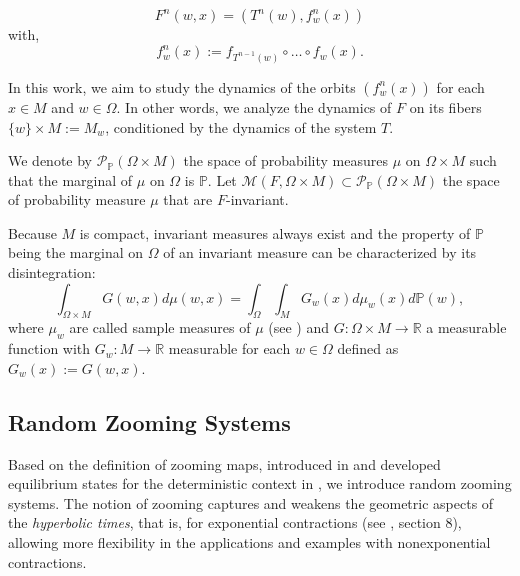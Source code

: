 \documentclass[12pt,a4paper]{amsart}
\theoremstyle{plain}
\begin{document}
	$$
	F^{n}(w, x) = (T^{n}(w), f^{n}_{w}(x))
	$$
	with, 
	\[
	f^{n}_{w}(x):= f_{T^{n-1}(w)} \circ \dots \circ f_{w}(x).
	\]
	
	
	
	In this work, we aim to study the dynamics of the orbits $(f_w^n(x))$ for each $x\in M$ and $w\in \Omega$. In other words, we analyze the dynamics of $F$ on its fibers $\{w\}\times M:=M_w$, conditioned by the dynamics of the system $T$.
	
	We denote by $\mathcal{P}_{\mathbb{P}}(\Omega \times M)$ the space of probability measures $\mu$ on $\Omega \times M$ such that the marginal of $\mu$ on $\Omega$ is $\mathbb{P}$. Let $\mathcal{M}(F, \Omega \times M) \subset \mathcal{P}_{\mathbb{P}}(\Omega \times M)$ the space of probability measure $\mu$ that are $F$-invariant. 
	
	Because $M$ is compact, invariant measures always exist and the property of $\mathbb{P}$ being the
	marginal on $\Omega$ of an invariant measure can be characterized by its disintegration:
	\[
	\int_{\Omega\times M} G(w,x) d\mu(w,x) =\int_{\Omega} \int_{M} G_{w}(x) d\mu_{w}(x)d\mathbb{P}(w),	
	\]
	where $\mu_{w}$ are called sample measures of $\mu$ (see \cite{L}) and $G:\Omega\times M \rightarrow \mathbb{R}$ a measurable function with $G_w:M\rightarrow \mathbb{R}$ measurable for each $w\in \Omega$ defined as $G_{w}(x):= G(w,x)$.
	
	\subsection{Random Zooming Systems}
	
	Based on the definition of zooming maps, introduced in \cite{Pi1} and developed equilibrium states for the deterministic context in \cite{S}, we introduce random zooming systems. The notion of zooming captures and weakens the geometric aspects of the {\it hyperbolic times}, that is, for exponential contractions (see \cite{Pi1}, section 8), allowing more flexibility in the applications and examples with nonexponential contractions.
	
\end{document}
